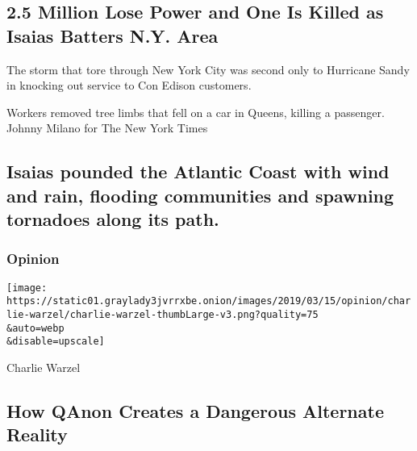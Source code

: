 \href{/2020/08/04/nyregion/isaias-ny.html}{}

\hypertarget{25-million-lose-power-and-one-is-killed-as-isaias-batters-ny-area}{%
\subsection{2.5 Million Lose Power and One Is Killed as Isaias Batters
N.Y.
Area}\label{25-million-lose-power-and-one-is-killed-as-isaias-batters-ny-area}}

The storm that tore through New York City was second only to Hurricane
Sandy in knocking out service to Con Edison customers.

\href{/2020/08/04/nyregion/isaias-ny.html}{}

\href{/2020/08/04/nyregion/isaias-ny.html}{}

Workers removed tree limbs that fell on a car in Queens, killing a
passenger. Johnny Milano for The New York Times

\href{/2020/08/04/us/hurricane-isaias-updates.html}{}

\hypertarget{isaias-pounded-the-atlantic-coast-with-wind-and-rain-flooding-communities-and-spawning-tornadoes-along-its-path}{%
\subsection{Isaias pounded the Atlantic Coast with wind and rain,
flooding communities and spawning tornadoes along its
path.}\label{isaias-pounded-the-atlantic-coast-with-wind-and-rain-flooding-communities-and-spawning-tornadoes-along-its-path}}

\href{https://www.nytimes3xbfgragh.onion/section/opinion?pagetype=Homepage\&action=click\&module=Opinion}{}

\hypertarget{opinion}{%
\subsubsection{Opinion}\label{opinion}}

\href{/2020/08/04/opinion/qanon-conspiracy-theory-arg.html}{}

\texttt{[image: https://static01.graylady3jvrrxbe.onion/images/2019/03/15/opinion/charlie-warzel/charlie-warzel-thumbLarge-v3.png?quality=75\\\&auto=webp\\\&disable=upscale]}

Charlie Warzel

\hypertarget{how-qanon-creates-a-dangerous-alternate-reality}{%
\subsection{How QAnon Creates a Dangerous Alternate
Reality}\label{how-qanon-creates-a-dangerous-alternate-reality}}

